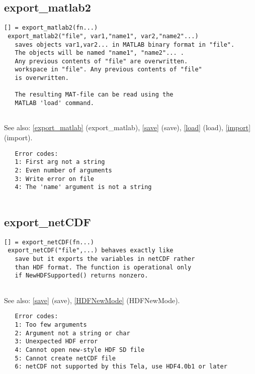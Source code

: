 \documentclass[a4paper]{article}
\begin{document}
\subsection{export\_matlab2\label{export_matlab2}}

\begin{tscreen}
\begin{verbatim}
[] = export_matlab2(fn...)
 export_matlab2("file", var1,"name1", var2,"name2"...)
   saves objects var1,var2... in MATLAB binary format in "file".
   The objects will be named "name1", "name2"... .
   Any previous contents of "file" are overwritten.
   workspace in "file". Any previous contents of "file"
   is overwritten.

   The resulting MAT-file can be read using the
   MATLAB 'load' command.
   
\end{verbatim}

See also: \ref{export_matlab} {(export\_matlab)}, \ref{save} {(save)}, \ref{load} {(load)}, \ref{import} {(import)}.
\begin{verbatim}
   Error codes:
   1: First arg not a string
   2: Even number of arguments
   3: Write error on file
   4: The 'name' argument is not a string
   
\end{verbatim}
\end{tscreen}





\subsection{export\_netCDF\label{export_netCDF}}

\begin{tscreen}
\begin{verbatim}
[] = export_netCDF(fn...)
 export_netCDF("file",...) behaves exactly like
   save but it exports the variables in netCDF rather
   than HDF format. The function is operational only
   if NewHDFSupported() returns nonzero.
   
\end{verbatim}

See also: \ref{save} {(save)}, \ref{HDFNewMode} {(HDFNewMode)}.
\begin{verbatim}
   Error codes:
   1: Too few arguments
   2: Argument not a string or char
   3: Unexpected HDF error
   4: Cannot open new-style HDF SD file
   5: Cannot create netCDF file
   6: netCDF not supported by this Tela, use HDF4.0b1 or later
\end{verbatim}
\end{tscreen}
\end{document}

